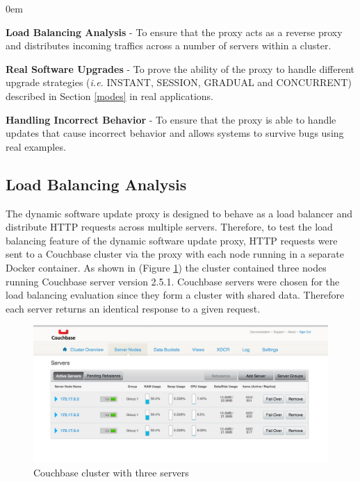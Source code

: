 \documentclass[a4paper,11pt,twoside]{report}
\begin{document}
\begin{list}{-}{}
  \itemsep0em
  \item{\textbf{Load Balancing Analysis}} - To ensure that the proxy acts as a reverse proxy and distributes incoming traffics across a number of servers within a cluster. 

  \item{\textbf{Real Software Upgrades}} - To prove the ability of the proxy to handle different upgrade strategies (\textit{i.e.} INSTANT, SESSION, GRADUAL and CONCURRENT) described in Section \ref{modes} in real applications. 
  
   \item{\textbf{Handling Incorrect Behavior}} - To ensure that the proxy is able to handle updates that cause incorrect behavior and allows systems to survive bugs using real examples. 
\end{list} 

\subsection{Load Balancing Analysis}
The dynamic software update proxy is designed to behave as a load balancer and distribute  HTTP requests across multiple servers. Therefore, to test the load balancing feature of the dynamic software update proxy, HTTP requests were sent to a Couchbase cluster via the proxy with each node running in a separate Docker container. As shown in (Figure \ref{couchbase_cluster}) the cluster contained three nodes running Couchbase server version 2.5.1.  Couchbase servers were chosen for the load balancing evaluation since they form a cluster with shared data. Therefore each server returns an identical response to a given request.

\begin{figure}[!ht]
  \centering
     \includegraphics[scale=0.40]{couchbase_cluster}
  \caption{Couchbase cluster with three servers}
  \label{couchbase_cluster}
\end{figure} 
\end{document}
